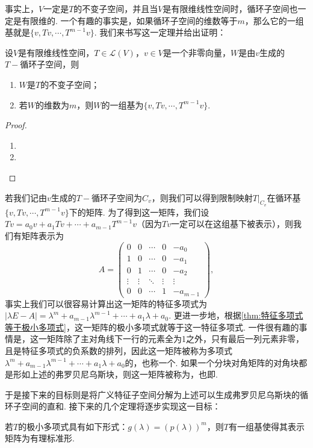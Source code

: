 事实上，$V$一定是$T$的不变子空间，并且当$V$是有限维线性空间时，循环子空间也一定是有限维的. 一个有趣的事实是，如果循环子空间的维数等于$m$，那么它的一组基就是$\{v,Tv,\cdots,T^{m-1}v\}$. 我们来书写这一定理并给出证明：
\begin{theorem}{}{}
    设$V$是有限维线性空间，$T\in\mathcal{L}(V)$，$v\in V$是一个非零向量，$W$是由$v$生成的$T-\text{循环子空间}$，则
    \begin{enumerate}
        \item $W$是$T$的不变子空间；
        \item 若$W$的维数为$m$，则$W$的一组基为$\{v,Tv,\cdots,T^{m-1}v\}$.
    \end{enumerate}
\end{theorem}
\begin{proof}
    \begin{enumerate}
        \item
        \item
    \end{enumerate}
\end{proof}

若我们记由$v$生成的$T-\text{循环子空间}$为$C_v$，则我们可以得到限制映射$T|_{C_v}$在循环基$\{v,Tv,\cdots,T^{m-1}v\}$下的矩阵. 为了得到这一矩阵，我们设$Tv=a_0v+a_1Tv+\cdots+a_{m-1}T^{m-1}v$（因为$Tv$一定可以在这组基下被表示），则我们有矩阵表示为
\[A=\begin{pmatrix}
        0      & 0      & \cdots & 0      & -a_0     \\
        1      & 0      & \cdots & 0      & -a_1     \\
        0      & 1      & \cdots & 0      & -a_2     \\
        \vdots & \vdots & \ddots & \vdots & \vdots   \\
        0      & 0      & \cdots & 1      & -a_{m-1}
    \end{pmatrix},\]
事实上我们可以很容易计算出这一矩阵的特征多项式为$|\lambda E-A|=\lambda^m+a_{m-1}\lambda^{m-1}+\cdots+a_1\lambda+a_0$. 更进一步地，根据\autoref{thm:特征多项式等于极小多项式}，这一矩阵的极小多项式就等于这一特征多项式. 一件很有趣的事情是，这一矩阵除了主对角线下一行的元素全为1之外，只有最后一列元素非零，且是特征多项式的负系数的排列，因此这一矩阵被称为多项式$\lambda^m+a_{m-1}\lambda^{m-1}+\cdots+a_1\lambda+a_0$的，也称一个. 如果一个分块对角矩阵的对角块都是形如上述的弗罗贝尼乌斯块，则这一矩阵被称为，也即.

于是接下来的目标则是将广义特征子空间分解为上述可以生成弗罗贝尼乌斯块的循环子空间的直和. 接下来的几个定理将逐步实现这一目标：
\begin{theorem}{}{}
    若$T$的极小多项式具有如下形式：$g(\lambda)=(p(\lambda))^m$，则$T$有一组基使得其表示矩阵为有理标准形.
\end{theorem}

